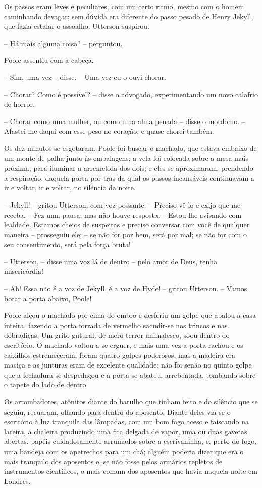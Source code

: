 Os passos eram leves e peculiares, com um certo ritmo, mesmo com o homem
caminhando devagar; sem dúvida era diferente do passo pesado de Henry
Jekyll, que fazia estalar o assoalho.  Utterson suspirou.

-- Há mais alguma coisa? -- perguntou.

Poole assentiu com a cabeça.

-- Sim, uma vez -- disse. -- Uma vez eu o ouvi chorar.

-- Chorar?  Como é possível? -- disse o advogado, experimentando um novo
calafrio de horror.

-- Chorar como uma mulher, ou como uma alma penada -- disse o mordomo. --
Afastei-me daqui com esse peso no coração, e quase chorei também.

Os dez minutos se esgotaram.  Poole foi buscar o machado, que estava
embaixo de um monte de palha junto às embalagens; a vela foi colocada
sobre a mesa mais próxima, para iluminar a arremetida dos dois; e eles
se aproximaram, prendendo a respiração, daquela porta por trás da qual
os passos incansáveis continuavam a ir e voltar, ir e voltar, no
silêncio da noite.

-- Jekyll! -- gritou Utterson, com voz possante. -- Preciso vê-lo e exijo
que me receba. -- Fez uma pausa, mas não houve resposta. -- Estou lhe
avisando com lealdade.  Estamos cheios de suspeitas e preciso conversar
com você de qualquer maneira -- prosseguiu ele; -- se não for por bem,
será por mal; se não for com o seu consentimento, será pela força
bruta!

-- Utterson, -- disse uma voz lá de dentro -- pelo amor de Deus, tenha
misericórdia!

-- Ah!  Essa não é a voz de Jekyll, é a voz de Hyde! -- gritou Utterson.
-- Vamos botar a porta abaixo, Poole!

Poole alçou o machado por cima do ombro e desferiu um golpe que abalou a
casa inteira, fazendo a porta forrada de vermelho sacudir-se nos
trincos e nas dobradiças.  Um grito gutural, de mero terror animalesco,
soou dentro do escritório.  O machado voltou a se erguer, e mais uma
vez a porta rachou e os caixilhos estremeceram; foram quatro golpes
poderosos, mas a madeira era maciça e as junturas eram de excelente
qualidade; não foi senão no quinto golpe que a fechadura se despedaçou
e a porta se abateu, arrebentada, tombando sobre o tapete do lado de
dentro. 

Os arrombadores, atônitos diante do barulho que tinham feito e do
silêncio que se seguiu, recuaram, olhando para dentro do aposento. 
Diante deles via-se o escritório à luz tranquila das lâmpadas, com um
bom fogo aceso e faiscando na lareira, a chaleira produzindo uma fita
delgada de vapor, uma ou duas gavetas abertas, papéis cuidadosamente
arrumados sobre a escrivaninha, e, perto do fogo, uma bandeja com os
apetrechos para um chá; alguém poderia dizer que era o mais tranquilo
dos aposentos e, se não fosse pelos armários repletos de instrumentos
científicos, o mais comum dos aposentos que havia naquela noite em
Londres.

